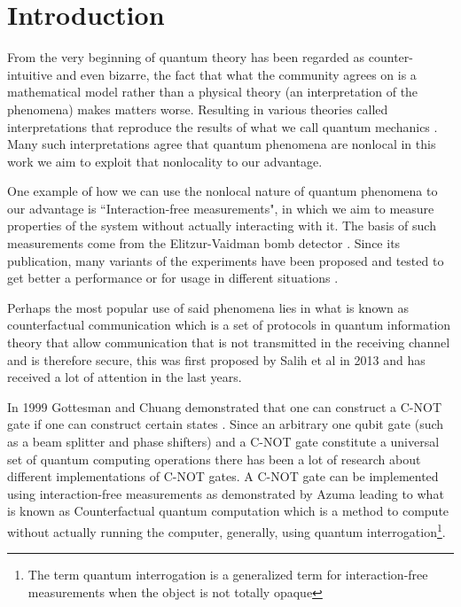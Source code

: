 \documentclass[12pt]{book}
\newcommand\blankpage{
    \null
    \thispagestyle{empty}
    \addtocounter{page}{0}
    \newpage
    }
\begin{document}
\pagebreak


\blankpage{}

\chapter*{Introduction}
\thispagestyle{plain}

From the very beginning of quantum theory has been regarded as counter-intuitive and even bizarre, the fact that what the community agrees on is a mathematical model rather than a physical theory (an interpretation of the phenomena) makes matters worse. Resulting in various theories called interpretations that reproduce the results of what we call quantum mechanics \cite{interpre}. Many such interpretations agree that quantum phenomena are nonlocal in this work we aim to exploit that nonlocality to our advantage.

One example of how we can use the nonlocal nature of quantum phenomena to our advantage is ``Interaction-free measurements", in which we aim to measure properties of the system without actually interacting with it. The basis of such measurements come from the Elitzur-Vaidman bomb detector \cite{Elitzur}. Since its publication, many variants of the experiments have been proposed and tested to get better a performance or for usage in different situations \cite{Azuma,exp,QI1,Azuma2018,electronic}.

Perhaps the most popular use of said phenomena lies in what is known as counterfactual communication which is a set of protocols in quantum information theory that allow communication that is not transmitted in the receiving channel and is therefore secure, this was first proposed by Salih et al in 2013 \cite{CComunication} and has received a lot of attention in the last years.

In 1999 Gottesman and Chuang demonstrated that one can construct a C-NOT gate if one can construct certain states \cite{Gottesman}. Since an arbitrary one qubit gate (such as a beam splitter and phase shifters) and a C-NOT gate constitute a universal set of quantum computing operations \cite{chuang} there has been a lot of research about different implementations of C-NOT gates. A C-NOT gate can be implemented using interaction-free measurements as demonstrated by Azuma \cite{AzumaComputation} leading to what is known as Counterfactual quantum computation which is a method to compute without actually running the computer, generally, using quantum interrogation\footnote{The term quantum interrogation is a generalized term for interaction-free measurements when the object is not totally opaque}\cite{Hosten}.
\pagebreak
\end{document}
